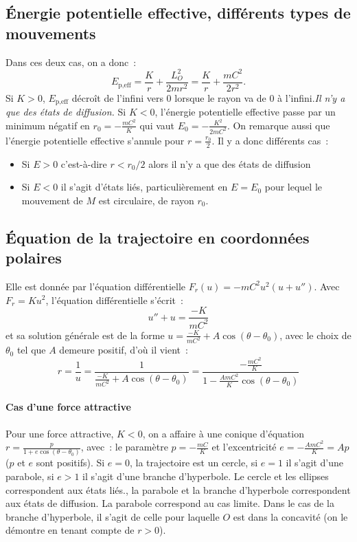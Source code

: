 \subsection{Énergie potentielle effective, différents types de mouvements}%
Dans ces deux cas, on a donc~:
\begin{equation}%
  E_{\text{p,eff}} = \frac{K}{r} + \frac{L_O^2}{2mr^2} = \frac{K}{r} + 
  \frac{mC^2}{2r^2}.
\end{equation}%
Si \(K >0\), \(E_{\text{p,eff}}\) décroît de l'infini vers 0 lorsque le rayon 
va de 0 à l'infini.\emph{Il n'y a que des états de diffusion.}
Si \(K < 0\), l'énergie potentielle effective passe par un minimum négatif en 
\(r_0 = -\frac{mC^2}{K}\) qui vaut \(E_0 = -\frac{K^2}{2mC^2}\). On remarque 
aussi que l'énergie potentielle effective s'annule pour \(r = \frac{r_0}{2}\).
Il y a donc différents cas~:
\begin{itemize}%
  \item Si \(E>0\) c'est-à-dire \(r<r_0/2\) alors il n'y a que des états de 
    diffusion
  \item Si \(E<0\) il s'agit d'états liés, particulièrement en \(E = E_0\) pour 
    lequel le mouvement de \(M\) est circulaire, de rayon \(r_0\).
\end{itemize}%
\subsection{Équation de la trajectoire en coordonnées polaires}%
Elle est donnée par l'équation différentielle \(F_r(u) = -mC^2u^2(u+u'')\). 
Avec \(F_r = Ku^2\), l'équation différentielle s'écrit~:
\begin{equation}%
  u'' + u = \frac{-K}{mC^2}
\end{equation}%
et sa solution générale est de la forme \(u = \frac{-K}{mC^2} + 
A\cos(\theta-\theta_0)\), avec le choix de \(\theta_0\) tel que \(A\) demeure 
positif, d'où il vient~:
\begin{equation}%
  r = \frac{1}{u} = \frac{1}{\frac{-K}{mC^2} + A\cos(\theta - \theta_0)} = 
  \frac{-\frac{mC^2}{K}}{1 - \frac{AmC^2}{K}\cos(\theta - \theta_0)}
\end{equation}%
\paragraph{Cas d'une force attractive}%
Pour une force attractive, \(K < 0\), on a affaire à une conique d'équation \(r 
= \frac{p}{1 + e\cos(\theta - \theta_0)}\), avec~: le paramètre \(p = 
-\frac{mC}{K}\) et l'excentricité \(e = -\frac{AmC^2}{K} = Ap\) (\(p\) et \(e\) 
sont positifs). Si \(e=0\), la trajectoire est un cercle, si \(e=1\) il s'agit 
d'une parabole, si \(e>1\) il s'agit d'une branche d'hyperbole. Le cercle et 
les ellipses correspondent aux états liés., la parabole et la branche 
d'hyperbole correspondent aux états de diffusion. La parabole correspond au cas 
limite. Dans le cas de la branche d'hyperbole, il s'agit de celle pour laquelle 
\(O\) est dans la concavité (on le démontre en tenant compte de \(r>0\)).
